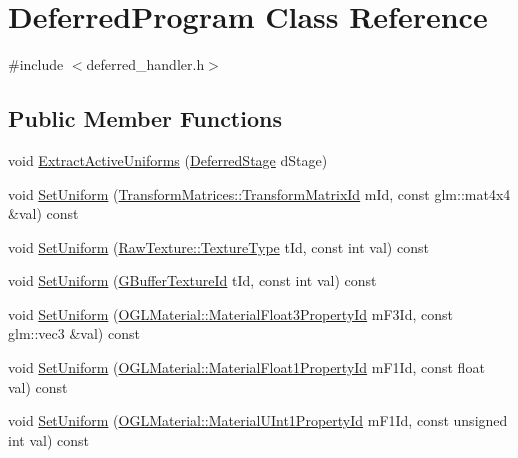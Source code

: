 \hypertarget{class_deferred_program}{}\section{Deferred\+Program Class Reference}
\label{class_deferred_program}


{\ttfamily \#include $<$deferred\+\_\+handler.\+h$>$}

\subsection*{Public Member Functions}
\begin{DoxyCompactItemize}
\item 
void \hyperlink{class_deferred_program_a9166e298729d94cf487fed9887c65242}{Extract\+Active\+Uniforms} (\hyperlink{deferred__handler_8h_a623ca9c5815b447740795ef10bc3a9fe}{Deferred\+Stage} d\+Stage)
\item 
void \hyperlink{class_deferred_program_abfefbd4c5a3d52aabb17505251712d38}{Set\+Uniform} (\hyperlink{class_transform_matrices_ac0c0f9ab5279bfd44b4c1fd97f041521}{Transform\+Matrices\+::\+Transform\+Matrix\+Id} m\+Id, const glm\+::mat4x4 \&val) const 
\item 
void \hyperlink{class_deferred_program_aa30be0e9c89f23244b97759d0d039c87}{Set\+Uniform} (\hyperlink{class_raw_texture_ac0eafe7206f7f38aeb4e8e5631480f6d}{Raw\+Texture\+::\+Texture\+Type} t\+Id, const int val) const 
\item 
void \hyperlink{class_deferred_program_a747f47068673a863acecb1a276a4090d}{Set\+Uniform} (\hyperlink{deferred__handler_8h_a331a939e08dff83e0b0b62fbbd39c963}{G\+Buffer\+Texture\+Id} t\+Id, const int val) const 
\item 
void \hyperlink{class_deferred_program_aab46bce44b671b3640dd0f3f19ee78cc}{Set\+Uniform} (\hyperlink{class_o_g_l_material_a1fc530fc808e270be78c8b296abed0ce}{O\+G\+L\+Material\+::\+Material\+Float3\+Property\+Id} m\+F3\+Id, const glm\+::vec3 \&val) const 
\item 
void \hyperlink{class_deferred_program_a3a08be2519a0e471e21e79339dac8c47}{Set\+Uniform} (\hyperlink{class_o_g_l_material_a27506550fa395365703eb941e525e64c}{O\+G\+L\+Material\+::\+Material\+Float1\+Property\+Id} m\+F1\+Id, const float val) const 
\item 
void \hyperlink{class_deferred_program_a4101b0bdffc910f5efed3a3eace12c27}{Set\+Uniform} (\hyperlink{class_o_g_l_material_a79448ba294d1923d56ebca495b0c272e}{O\+G\+L\+Material\+::\+Material\+U\+Int1\+Property\+Id} m\+F1\+Id, const unsigned int val) const 

\end{DoxyCompactItemize}
